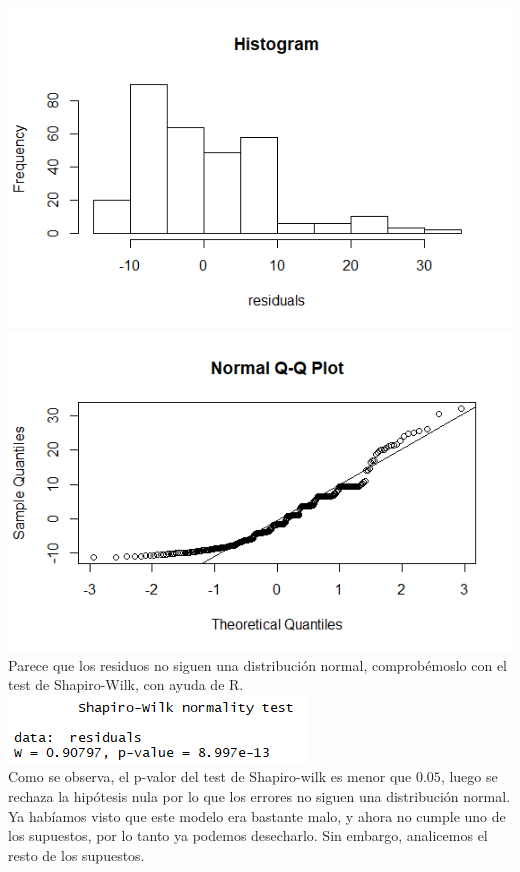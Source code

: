 \documentclass[twoside]{article}
\begin{document}
\begin{multicols}{2}
\includegraphics[scale = 0.4]{images/pic_05.png} \\
\includegraphics[scale=0.4]{images/pic_06.png} \\

Parece que los residuos no siguen una distribuci\'on normal, comprob\'emoslo con el test de Shapiro-Wilk, con ayuda de R.\\

\includegraphics[scale = 0.6]{images/pic_07.png} \\

Como se observa, el p-valor del test de Shapiro-wilk es menor que $0.05$, luego se rechaza la hip\'otesis nula por lo que los errores no siguen una distribuci\'on normal. Ya hab\'iamos visto que este modelo era bastante malo, y ahora no cumple uno de los supuestos, por lo tanto ya podemos desecharlo. Sin embargo, analicemos el resto de los supuestos.\\


\end{multicols}
\end{document}
